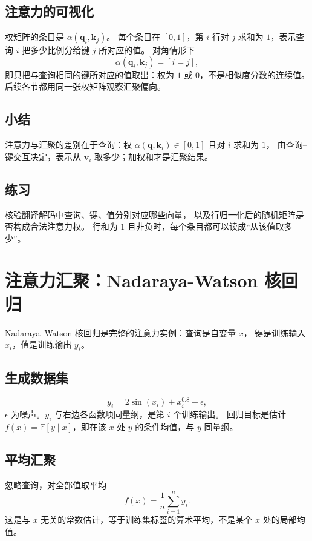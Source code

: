 \subsection{注意力的可视化}

权矩阵的条目是 $\alpha(\bm{q}_i,\bm{k}_j)$。
每个条目在 $[0,1]$，第 $i$ 行对 $j$ 求和为 $1$，表示查询 $i$ 把多少比例分给键 $j$ 所对应的值。
对角情形下
\[
\alpha(\bm{q}_i,\bm{k}_j)=[i=j],
\]
即只把与查询相同的键所对应的值取出：权为 $1$ 或 $0$，不是相似度分数的连续值。
后续各节都用同一张权矩阵观察汇聚偏向。

\subsection{小结}

注意力与汇聚的差别在于查询：权 $\alpha(\bm{q},\bm{k}_i)\in[0,1]$ 且对 $i$ 求和为 $1$，
由查询--键交互决定，表示从 $\bm{v}_i$ 取多少；加权和才是汇聚结果。

\subsection{练习}

核验翻译解码中查询、键、值分别对应哪些向量，
以及行归一化后的随机矩阵是否构成合法注意力权。
行和为 $1$ 且非负时，每个条目都可以读成“从该值取多少”。

\section{注意力汇聚：Nadaraya-Watson 核回归}

Nadaraya--Watson 核回归是完整的注意力实例：查询是自变量 $x$，
键是训练输入 $x_i$，值是训练输出 $y_i$。

\subsection{生成数据集}

\[
y_i=2\sin(x_i)+x_i^{0.8}+\epsilon,
\]
$\epsilon$ 为噪声。$y_i$ 与右边各函数项同量纲，是第 $i$ 个训练输出。
回归目标是估计 $f(x)=\mathbb{E}[y\mid x]$，即在该 $x$ 处 $y$ 的条件均值，与 $y$ 同量纲。

\subsection{平均汇聚}

忽略查询，对全部值取平均
\[
f(x)=\frac{1}{n}\sum_{i=1}^{n}y_i.
\]
这是与 $x$ 无关的常数估计，等于训练集标签的算术平均，不是某个 $x$ 处的局部均值。


